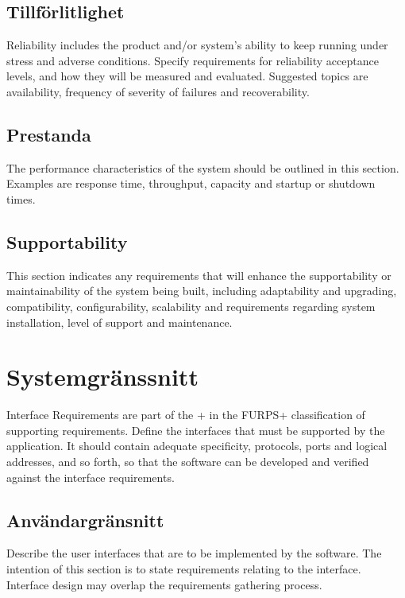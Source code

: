 \subsection{Tillförlitlighet}

Reliability includes the product and/or system's ability to keep running under stress and adverse conditions. Specify requirements for reliability acceptance levels, and how they will be measured and evaluated. Suggested topics are availability, frequency of severity of failures and recoverability.

\subsection{Prestanda}

The performance characteristics of the system should be outlined in this section. Examples are response time, throughput, capacity and startup or shutdown times.

\subsection{Supportability}

This section indicates any requirements that will enhance the supportability or maintainability of the system being built, including adaptability and upgrading, compatibility, configurability, scalability and requirements regarding system installation, level of support and maintenance.

\section{Systemgränssnitt}

Interface Requirements are part of the + in the FURPS+ classification of supporting requirements. Define the interfaces that must be supported by the application. It should contain adequate specificity, protocols, ports and logical addresses, and so forth, so that the software can be developed and verified against the interface requirements.

\subsection{Användargränsnitt}

Describe the user interfaces that are to be implemented by the software. The intention of this section is to state requirements relating to the interface. Interface design may overlap the requirements gathering process.

